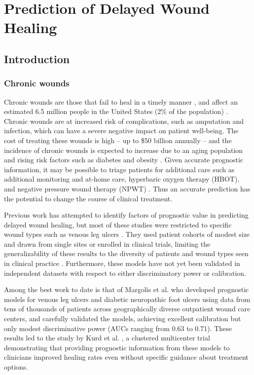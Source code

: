 \chapter{Prediction of Delayed Wound Healing}
\section{Introduction}
\subsection{Chronic wounds}
Chronic wounds are those that fail to heal in a timely manner
\cite{Lazarus1994}, and affect an estimated 6.5 million people in the
United States (2\% of the population) \cite{Fife2012}.  Chronic wounds
are at increased risk of complications, such as amputation and
infection, which can have a severe negative impact on patient
well-being.  The cost of treating these wounds is high – up to \$50
billion annually \cite{Driver2010,Hess1996,Kuhn1992} – and the
incidence of chronic wounds is expected to increase due to an aging
population and rising risk factors such as diabetes and obesity
\cite{Sen2009}. Given accurate prognostic information, it may be
possible to triage patients for additional care such as additional
monitoring and at-home care, hyperbaric oxygen therapy (HBOT), and
negative pressure wound therapy (NPWT)
\cite{Andros2006,Clemens2008,Melling2006,Stojadinovic2008,Wu2008,Armstrong2008,Bozzuto2000}.
Thus an accurate prediction has the potential to change the course of
clinical treatment.

Previous work has attempted to identify factors of prognostic value in
predicting delayed wound healing, but most of these studies were
restricted to specific wound types such as venous leg ulcers
\cite{Margolis2003,Margolis2004,Cardinal2008,Ubbink2013,Kantor1998,Wicke2009}.
They used patient cohorts of modest size and drawn from single sites
or enrolled in clinical trials, limiting the generalizability of these
results to the diversity of patients and wound types seen in clinical
practice \cite{Carter2009}.  Furthermore, these models have not yet
been validated in independent datasets with respect to either
discriminatory power or calibration.

Among the best work to date is that of Margolis et
al. \cite{Margolis2003,Margolis2004} who developed prognostic models
for venous leg ulcers and diabetic neuropathic foot ulcers using data
from tens of thousands of patients across geographically diverse
outpatient wound care centers, and carefully validated the models,
achieving excellent calibration but only modest discriminative power
(AUCs ranging from 0.63 to 0.71).  These results led to the study by
Kurd et al. \cite{Kurd2009}, a clustered multicenter trial
demonstrating that providing prognostic information from these models
to clinicians improved healing rates even without specific guidance
about treatment options.

